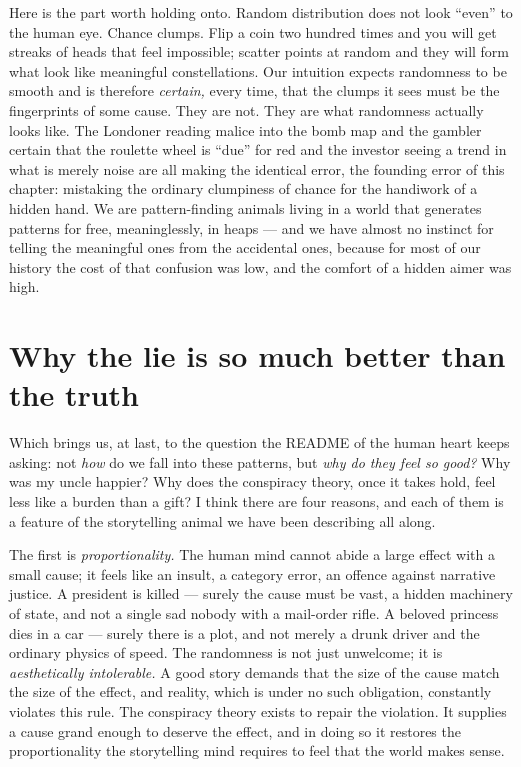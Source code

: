 Here is the part worth holding onto. Random distribution does not look ``even'' to the human eye. Chance clumps. Flip a coin two hundred times and you will get streaks of heads that feel impossible; scatter points at random and they will form what look like meaningful constellations. Our intuition expects randomness to be smooth and is therefore \emph{certain,} every time, that the clumps it sees must be the fingerprints of some cause. They are not. They are what randomness actually looks like. The Londoner reading malice into the bomb map and the gambler certain that the roulette wheel is ``due'' for red and the investor seeing a trend in what is merely noise are all making the identical error, the founding error of this chapter: mistaking the ordinary clumpiness of chance for the handiwork of a hidden hand. We are pattern-finding animals living in a world that generates patterns for free, meaninglessly, in heaps — and we have almost no instinct for telling the meaningful ones from the accidental ones, because for most of our history the cost of that confusion was low, and the comfort of a hidden aimer was high.

\section*{Why the lie is so much better than the truth}

Which brings us, at last, to the question the README of the human heart keeps asking: not \emph{how} do we fall into these patterns, but \emph{why do they feel so good?} Why was my uncle happier? Why does the conspiracy theory, once it takes hold, feel less like a burden than a gift? I think there are four reasons, and each of them is a feature of the storytelling animal we have been describing all along.

The first is \emph{proportionality.} The human mind cannot abide a large effect with a small cause; it feels like an insult, a category error, an offence against narrative justice. A president is killed — surely the cause must be vast, a hidden machinery of state, and not a single sad nobody with a mail-order rifle. A beloved princess dies in a car — surely there is a plot, and not merely a drunk driver and the ordinary physics of speed. The randomness is not just unwelcome; it is \emph{aesthetically intolerable.} A good story demands that the size of the cause match the size of the effect, and reality, which is under no such obligation, constantly violates this rule. The conspiracy theory exists to repair the violation. It supplies a cause grand enough to deserve the effect, and in doing so it restores the proportionality the storytelling mind requires to feel that the world makes sense.

